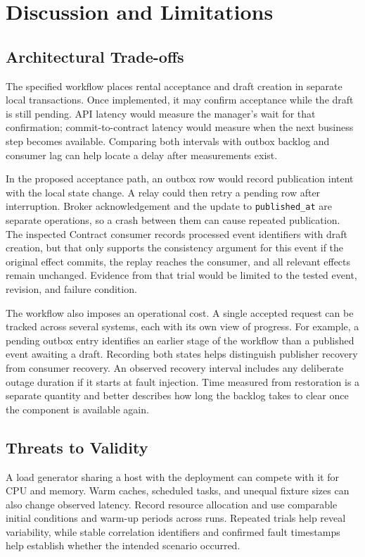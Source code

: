\section{Discussion and Limitations}\label{sec:discussion}

\subsection{Architectural Trade-offs}
The specified workflow places rental acceptance and draft creation in separate local transactions. Once implemented, it may confirm acceptance while the draft is still pending. API latency would measure the manager's wait for that confirmation; commit-to-contract latency would measure when the next business step becomes available. Comparing both intervals with outbox backlog and consumer lag can help locate a delay after measurements exist.

In the proposed acceptance path, an outbox row would record publication intent with the local state change. A relay could then retry a pending row after interruption. Broker acknowledgement and the update to \texttt{published\_at} are separate operations, so a crash between them can cause repeated publication. The inspected Contract consumer records processed event identifiers with draft creation, but that only supports the consistency argument for this event if the original effect commits, the replay reaches the consumer, and all relevant effects remain unchanged. Evidence from that trial would be limited to the tested event, revision, and failure condition.

The workflow also imposes an operational cost. A single accepted request can be tracked across several systems, each with its own view of progress. For example, a pending outbox entry identifies an earlier stage of the workflow than a published event awaiting a draft. Recording both states helps distinguish publisher recovery from consumer recovery. An observed recovery interval includes any deliberate outage duration if it starts at fault injection. Time measured from restoration is a separate quantity and better describes how long the backlog takes to clear once the component is available again.

\subsection{Threats to Validity}
A load generator sharing a host with the deployment can compete with it for CPU and memory. Warm caches, scheduled tasks, and unequal fixture sizes can also change observed latency. Record resource allocation and use comparable initial conditions and warm-up periods across runs. Repeated trials help reveal variability, while stable correlation identifiers and confirmed fault timestamps help establish whether the intended scenario occurred.

